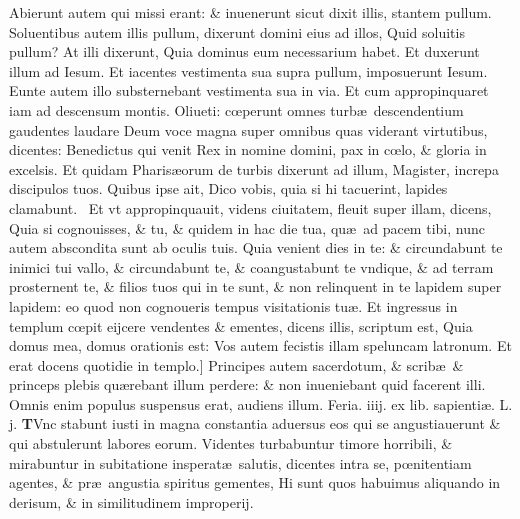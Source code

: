 \documentclass[a5paper,10pt]{book}
\def\leftmarginnote{%
	\lrmarginnote{\hskip -\marginparsep \hskip -6.5em}}
\def\rightmarginnote{%
	\lrmarginnote{\hskip\columnwidth \hskip -1em}}
\def\ae{æ}
\def\oe{œ}
\begin{document}
\begin{multicols*}{2}
Abierunt autem qui missi erant: \& inuenerunt sicut dixit illis, stantem pullum. Soluentibus autem illis pullum, dixerunt domini eius ad illos, Quid soluitis pullum?
At illi dixerunt, Quia dominus eum necessarium habet. Et duxerunt illum ad Iesum. Et iacentes vestimenta sua supra pullum, imposuerunt Iesum.
Eunte autem illo substernebant vestimenta sua in via. Et cum appropinquaret iam ad descensum montis. Oliueti: c\oe perunt omnes turb\ae \ descendentium gaudentes laudare Deum voce magna super omnibus quas viderant virtutibus, dicentes: Benedictus qui venit Rex in nomine domini, pax in c\oe lo, \& gloria in excelsis.
Et quidam Pharis\ae orum de turbis dixerunt ad illum, Magister, increpa discipulos tuos. Quibus ipse ait, Dico vobis, quia si hi tacuerint, lapides clamabunt. \textdagger \ 
Et\leftmarginnote{\begin{flushright}C\end{flushright}} vt appropinquauit, videns ciuitatem, fleuit super illam, dicens, Quia si cognouisses, \& tu, \& quidem in hac die tua, qu\ae \ ad pacem tibi, nunc autem abscondita sunt ab oculis tuis.
Quia venient dies in te: \& circundabunt te inimici tui vallo, \& circundabunt te, \& coangustabunt te vndique, \& ad terram prosternent te, \& filios tuos qui in te sunt, \& non relinquent in te lapidem super lapidem: eo quod non cognoueris tempus visitationis tu\ae .
Et ingressus in templum c\oe pit eijcere vendentes \& ementes, dicens illis, scriptum est, Quia domus mea, domus orationis est: Vos autem fecistis illam speluncam latronum.
Et erat docens quotidie in templo.] Principes\leftmarginnote{\begin{flushright}D\end{flushright}} autem sacerdotum, \& scrib\ae \ \& princeps plebis qu\ae rebant illum perdere: \& non inueniebant quid facerent illi. Omnis enim populus suspensus erat, audiens illum.
\newline \textswab{C} \color{red} \hypertarget{WED-TERTIA-POST-ADV}{Feria. iiij.} ex lib. sapienti\ae . L. j. \color{black}
\bookmark[dest=WED-TERTIA-POST-ADV]{FERIA QVARTA}
\vspace{-.25em}
\lettrine[lines=2]{\bfseries T}{}\textdagger Vnc\rightmarginnote{c.5.a} stabunt iusti in magna constantia aduersus eos qui se angustiauerunt \& qui abstulerunt labores eorum. %
Videntes turbabuntur timore horribili, \& mirabuntur in subitatione insperat\ae \ salutis, dicentes intra se, p\oe nitentiam agentes, \& pr\ae \ angustia spiritus gementes, Hi sunt quos habuimus aliquando in derisum, \& in similitudinem improperij.

\end{multicols*}
\end{document}
